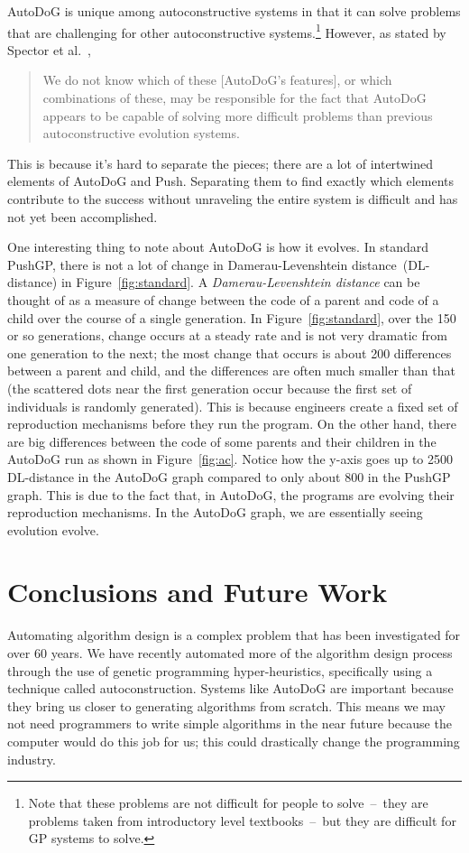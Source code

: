 \documentclass{sig-alternate}
\begin{document}
AutoDoG is unique among autoconstructive systems in that it can solve problems that are challenging for other autoconstructive systems.\footnote{Note that these problems are not difficult for people to solve~--~they are problems taken from introductory level textbooks~--~but they are difficult for GP systems to solve.} However, as stated by Spector et al.~\cite{spector:2016},
\begin{quotation}
	We do not know which of these [AutoDoG's features], or which combinations of these, may be responsible for the fact that AutoDoG appears to be capable of solving more difficult problems than previous autoconstructive evolution systems.
\end{quotation}
This is because it's hard to separate the pieces; there are a lot of intertwined elements of AutoDoG and Push. Separating them to find exactly which elements contribute to the success without unraveling the entire system is difficult and has not yet been accomplished.

One interesting thing to note about AutoDoG is how it evolves. In standard PushGP, there is not a lot of change in Damerau-Levenshtein distance~(DL-distance) in Figure~\ref{fig:standard}. A \textit{Damerau-Levenshtein distance} can be thought of as a measure of change between the code of a parent and code of a child over the course of a single generation. In Figure~\ref{fig:standard}, over the 150 or so generations, change occurs at a steady rate and is not very dramatic from one generation to the next; the most change that occurs is about 200 differences between a parent and child, and the differences are often much smaller than that (the scattered dots near the first generation occur because the first set of individuals is randomly generated). This is because engineers create a fixed set of reproduction mechanisms before they run the program. On the other hand, there are big differences between the code of some parents and their children in the AutoDoG run as shown in Figure~\ref{fig:ac}. Notice how the y-axis goes up to 2500 DL-distance in the AutoDoG graph compared to only about 800 in the PushGP graph. This is due to the fact that, in AutoDoG, the programs are evolving their reproduction mechanisms. In the AutoDoG graph, we are essentially seeing evolution evolve.

\section{Conclusions and Future Work}
\label{sec:conclusion}
Automating algorithm design is a complex problem that has been investigated for over 60 years. We have recently automated more of the algorithm design process through the use of genetic programming hyper-heuristics, specifically using a technique called autoconstruction. Systems like AutoDoG are important because they bring us closer to generating algorithms from scratch. This means we may not need programmers to write simple algorithms in the near future because the computer would do this job for us; this could drastically change the programming industry.
\end{document}
